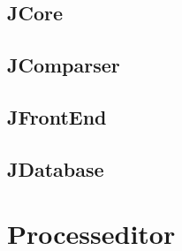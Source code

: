 \documentclass{acm_proc_article-sp}
\begin{document}
%
%
\subsection{JCore}

%
%
\subsection{JComparser}

%
%
\subsection{JFrontEnd}

%
%
\subsection{JDatabase}

%
%
\section{Processeditor}
\end{document}
